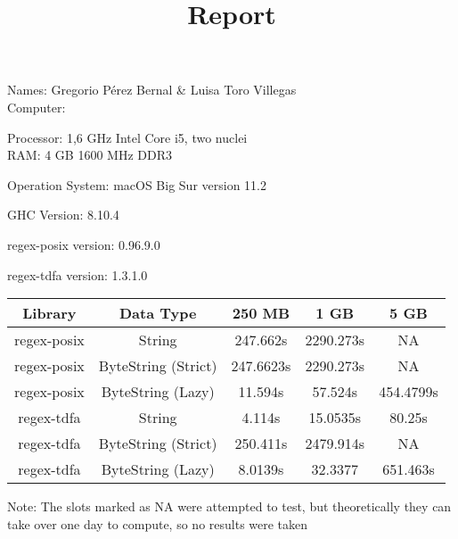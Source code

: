 \documentclass{article}
\title{Report}
\begin{document}
Names: Gregorio Pérez Bernal & Luisa Toro Villegas\\


Computer:

\begin{itemize}
Processor: 1,6 GHz Intel Core i5, two nuclei\\
RAM: 4 GB 1600 MHz DDR3\\
\end{itemize}

Operation System: macOS Big Sur version 11.2

GHC Version: 8.10.4

regex-posix version: 0.96.9.0

regex-tdfa version: 1.3.1.0

\begin{center}
 \begin{tabular}{||c c c c c||} 
 \hline
 Library & Data Type & 250 MB  & 1 GB & 5 GB \\ [0.5ex] 
 \hline\hline
 regex-posix & String & 247.662s & 2290.273s & NA\\ 
 \hline
 regex-posix & ByteString (Strict) & 247.6623s & 2290.273s & NA \\
 \hline
 regex-posix & ByteString (Lazy) & 11.594s & 57.524s & 454.4799s \\
 \hline
 regex-tdfa & String & 4.114s & 15.0535s & 80.25s \\
 \hline
 regex-tdfa & ByteString (Strict) & 250.411s & 2479.914s & NA\\  
 \hline
  regex-tdfa & ByteString (Lazy) & 8.0139s & 32.3377 & 651.463s\\ [0.5ex] 
 \hline
\end{tabular}
\end{center}

Note: The slots marked as NA were attempted to test, but theoretically they can take over one day to compute, so no results were taken
\end{document}
